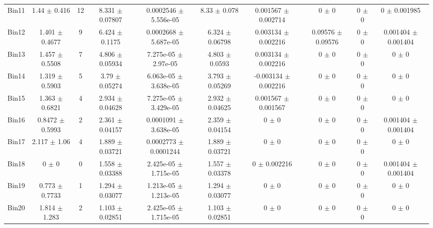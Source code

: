 \begin{tabular}{@{\extracolsep{4pt}}lccccccccc@{}}
     Bin11 & 1.44 $\pm$ 0.416 & 12 & 8.331 $\pm$ 0.07807 & 0.0002546 $\pm$ 5.556e-05 & 8.33 $\pm$ 0.078 & 0.001567 $\pm$ 0.002714 & 0 $\pm$ 0 & 0 $\pm$ 0 & 0 $\pm$ 0.001985 \\ 
     Bin12 & 1.401 $\pm$ 0.4677 & 9 & 6.424 $\pm$ 0.1175 & 0.0002668 $\pm$ 5.687e-05 & 6.324 $\pm$ 0.06798 & 0.003134 $\pm$ 0.002216 & 0.09576 $\pm$ 0.09576 & 0 $\pm$ 0 & 0.001404 $\pm$ 0.001404 \\ 
     Bin13 & 1.457 $\pm$ 0.5508 & 7 & 4.806 $\pm$ 0.05934 & 7.275e-05 $\pm$ 2.97e-05 & 4.803 $\pm$ 0.0593 & 0.003134 $\pm$ 0.002216 & 0 $\pm$ 0 & 0 $\pm$ 0 & 0 $\pm$ 0 \\ 
     Bin14 & 1.319 $\pm$ 0.5903 & 5 & 3.79 $\pm$ 0.05274 & 6.063e-05 $\pm$ 3.638e-05 & 3.793 $\pm$ 0.05269 & -0.003134 $\pm$ 0.002216 & 0 $\pm$ 0 & 0 $\pm$ 0 & 0 $\pm$ 0 \\ 
     Bin15 & 1.363 $\pm$ 0.6821 & 4 & 2.934 $\pm$ 0.04628 & 7.275e-05 $\pm$ 3.429e-05 & 2.932 $\pm$ 0.04625 & 0.001567 $\pm$ 0.001567 & 0 $\pm$ 0 & 0 $\pm$ 0 & 0 $\pm$ 0 \\ 
     Bin16 & 0.8472 $\pm$ 0.5993 & 2 & 2.361 $\pm$ 0.04157 & 0.0001091 $\pm$ 3.638e-05 & 2.359 $\pm$ 0.04154 & 0 $\pm$ 0 & 0 $\pm$ 0 & 0 $\pm$ 0 & 0.001404 $\pm$ 0.001404 \\ 
     Bin17 & 2.117 $\pm$ 1.06 & 4 & 1.889 $\pm$ 0.03721 & 0.0002773 $\pm$ 0.0001244 & 1.889 $\pm$ 0.03721 & 0 $\pm$ 0 & 0 $\pm$ 0 & 0 $\pm$ 0 & 0 $\pm$ 0 \\ 
     Bin18 & 0 $\pm$ 0 & 0 & 1.558 $\pm$ 0.03388 & 2.425e-05 $\pm$ 1.715e-05 & 1.557 $\pm$ 0.03378 & 0 $\pm$ 0.002216 & 0 $\pm$ 0 & 0 $\pm$ 0 & 0.001404 $\pm$ 0.001404 \\ 
     Bin19 & 0.773 $\pm$ 0.7733 & 1 & 1.294 $\pm$ 0.03077 & 1.213e-05 $\pm$ 1.213e-05 & 1.294 $\pm$ 0.03077 & 0 $\pm$ 0 & 0 $\pm$ 0 & 0 $\pm$ 0 & 0 $\pm$ 0 \\ 
     Bin20 & 1.814 $\pm$ 1.283 & 2 & 1.103 $\pm$ 0.02851 & 2.425e-05 $\pm$ 1.715e-05 & 1.103 $\pm$ 0.02851 & 0 $\pm$ 0 & 0 $\pm$ 0 & 0 $\pm$ 0 & 0 $\pm$ 0 \\ 
\hline\hline
  \end{tabular}
